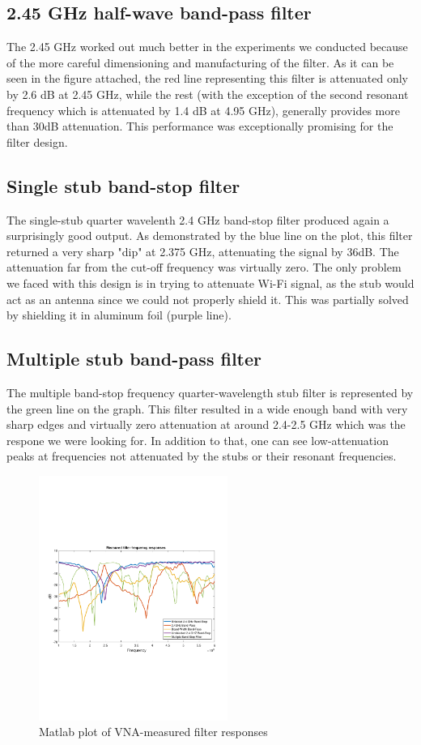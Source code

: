 \documentclass[letterpaper, 11pt, twocolumn]{article}
\begin{document}
\subsection{2.45 GHz half-wave band-pass filter}
The 2.45 GHz worked out much better in the experiments we conducted because of the more careful dimensioning and manufacturing of the filter. As it can be seen in the figure attached, the red line representing this filter is attenuated only by 2.6 dB at 2.45 GHz, while the rest (with the exception of the second resonant frequency which is attenuated by 1.4 dB at 4.95 GHz), generally provides more than 30dB attenuation. This performance was exceptionally promising for the filter design.  


\subsection{Single stub band-stop filter}
The single-stub quarter wavelenth 2.4 GHz band-stop filter produced again a surprisingly good output. As demonstrated by the blue line on the plot, this filter returned a very sharp "dip" at 2.375 GHz, attenuating the signal by 36dB. The attenuation far from the cut-off frequency was virtually zero. The only problem we faced with this design is in trying to attenuate Wi-Fi signal, as the stub would act as an antenna since we could not properly shield it. This was partially solved by shielding it in aluminum foil (purple line). 

\subsection{Multiple stub band-pass filter}
The multiple band-stop frequency quarter-wavelength stub filter is represented by the green line on the graph. This filter resulted in a wide enough band with very sharp edges and virtually zero attenuation at around 2.4-2.5 GHz which was the respone we were looking for. In addition to that, one can see low-attenuation peaks at frequencies not attenuated by the stubs or their resonant frequencies. 

\begin{figure}[H]
    \centering
    \includegraphics[trim={0.5cm, 7.8cm, 0.2cm, 8cm}, clip=true, width=0.55\textwidth]{graph.pdf}
    \caption{Matlab plot of VNA-measured filter responses}
\end{figure}
\end{document}

